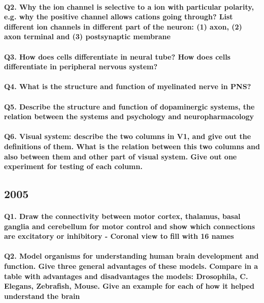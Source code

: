\documentclass[12pt,article,oneside,a4paper]{memoir}
\begin{document}
\paragraph{Q2. Why the ion channel is selective to a ion with particular polarity, e.g. why the positive channel allows cations going through? List different ion channels in different part of the neuron: (1) axon, (2) axon terminal and (3) postsynaptic membrane}
\paragraph{Q3. How does cells differentiate in neural tube? How does cells differentiate in peripheral nervous system?}
\paragraph{Q4. What is the structure and function of myelinated nerve in PNS?}
\paragraph{Q5. Describe the structure and function of dopaminergic systems, the relation between the systems and psychology and neuropharmacology}
\paragraph{Q6. Visual system: describe the two columns in V1, and give out the definitions of them. What is the relation between this two columns and also between them and other part of visual system. Give out one experiment for testing of each column.}


\subsection{2005}
\paragraph{Q1. Draw the connectivity between motor cortex, thalamus, basal ganglia and cerebellum for motor control and show which connections are excitatory or inhibitory - Coronal view to fill with 16 names}

\paragraph{Q2. Model organisms for understanding human brain development and function. Give three general advantages of these models. Compare in a table with advantages and disadvantages the models: Drosophila, C. Elegans, Zebrafish, Mouse. Give an example for each of how it helped understand the brain}
\end{document}
